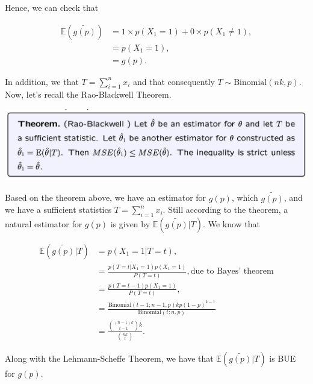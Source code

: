 \documentclass[12pt]{article}
\begin{document}
Hence, we can check that 

\begin{align}
\mathbb{E}(\tilde{g(p)}) & = 1 \times p(X_{1}=1) + 0 \times p(X_{1} \ne 1), \\
& = p(X_{1}=1), \\ 
& = g(p).
\end{align}

In addition, we that $T = \sum_{i=1}^{n} x_{i}$ and that consequently $T \sim \mbox{Binomial}(nk, p)$. Now, let's recall the Rao-Blackwell Theorem.

\includegraphics[width=1\linewidth]{rao_blackwell.png}

Based on the theorem above, we have an estimator for $g(p)$, which $\tilde{g(p)}$, and we have a sufficient statistics $T = \sum_{i=1}^{n}x_{i}$. Still according to the theorem, a natural estimator for $g(p)$ is given by $\mathbb{E}(\tilde{g(p)}|T)$. We know that

\begin{align}
\mathbb{E}(\tilde{g(p)}|T) & = p(X_{1} = 1| T = t), \\
& = \frac{p(T = t|X_{1} = 1) p(X_{1} = 1)}{P(T=t)}, \mbox{due to Bayes' theorem} \\
& = \frac{p(T = t - 1) p(X_{1} = 1)}{P(T=t)}, \\
& = \frac{\mbox{Binomial}(t-1; n-1, p) kp(1-p)^{k-1}}{\mbox{Binomial}(t; n, p)} \\
& = \frac{{(n-1)k \choose t-1} k}{{nk \choose t}}.
\end{align}

Along with the Lehmann-Scheffe Theorem, we have that $\mathbb{E}(\tilde{g(p)}|T)$ is BUE for $g(p)$.
\end{document}
